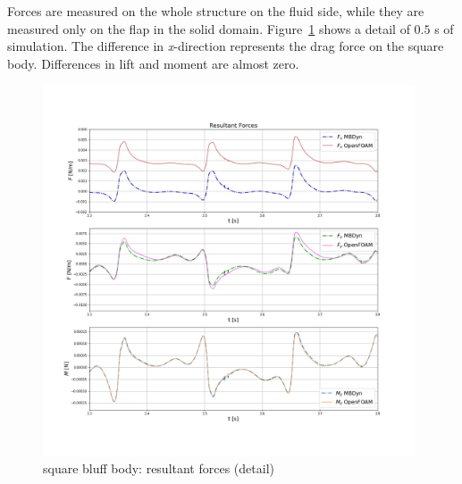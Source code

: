 Forces are measured on the whole structure on the fluid side, while they are measured only on the flap in the solid domain. Figure~\ref{fig:sq_force} shows a detail of $0.5$ \si{s} of simulation. The difference in \textit{x}-direction represents the drag force on the square body. Differences in lift and moment are almost zero. 

\begin{figure}[htbp!]
	\centering
	\includegraphics[width=0.98\textwidth, trim=20 100 20 100, clip]{images/sq-cyl/forces_sq.png}
	\caption{square bluff body: resultant forces (detail)}
	\label{fig:sq_force}
\end{figure}


